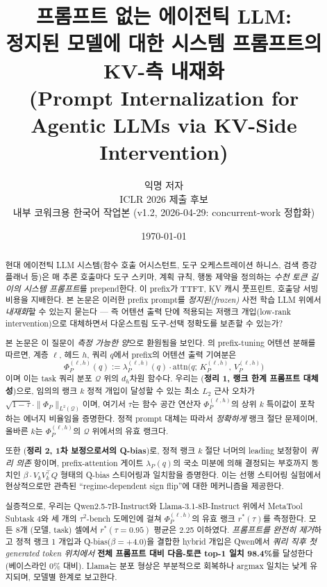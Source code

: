 \documentclass{article}
\title{
  프롬프트 없는 에이전틱 LLM:\\
  정지된 모델에 대한 시스템 프롬프트의 KV-측 내재화\\
  \large (Prompt Internalization for Agentic LLMs via KV-Side Intervention)
}
\author{
  익명 저자\\
  ICLR 2026 제출 후보\\
  내부 코워크용 한국어 작업본 (v1.2, 2026-04-29: concurrent-work 정합화)
}
\date{\today}
\theoremstyle{definition}
\newcommand{\Phip}{\Phi_P}
\newcommand{\dh}{d_h}
\newcommand{\attn}{\mathrm{attn}}
\begin{document}
\maketitle

\begin{abstract}
\noindent
현대 에이전틱 LLM 시스템(함수 호출 어시스턴트, 도구 오케스트레이션 하니스, 검색 증강 플래너 등)은 매 추론 호출마다 도구 스키마, 계획 규칙, 행동 제약을 정의하는 \emph{수천 토큰 길이의 시스템 프롬프트}를 prepend한다. 이 prefix가 TTFT, KV 캐시 풋프린트, 호출당 서빙 비용을 지배한다. 본 논문은 이러한 prefix prompt를 \emph{정지된(frozen)} 사전 학습 LLM 위에서 \emph{내재화}할 수 있는지 묻는다 — 즉 어텐션 출력 단에 적용되는 저랭크 개입(low-rank intervention)으로 대체하면서 다운스트림 도구-선택 정확도를 보존할 수 있는가?

본 논문은 이 질문이 \emph{측정 가능한 양}으로 환원됨을 보인다. \citet{he2022unified}의 prefix-tuning 어텐션 분해를 따르면, 계층 $\ell$, 헤드 $h$, 쿼리 $q$에서 prefix의 어텐션 출력 기여분은
\[
  \Phip^{(\ell,h)}(q) := \lambda_P^{(\ell,h)}(q)\cdot \attn\bigl(q;\, K_P^{(\ell,h)},\, V_P^{(\ell,h)}\bigr)
\]
이며 이는 task 쿼리 분포 $\mathcal{Q}$ 위의 $\dh$차원 함수다. 우리는 (\textbf{정리 1, 랭크 한계 프롬프트 대체성})으로, 임의의 랭크 $k$ 정적 개입이 달성할 수 있는 최소 $L_2$ 근사 오차가 $\sqrt{1-\tau}\cdot\|\Phip\|_{L^2(\mathcal{Q})}$이며, 여기서 $\tau$는 함수 공간 연산자 $\Phip^{(\ell,h)}$의 상위 $k$ 특이값이 포착하는 에너지 비율임을 증명한다. 정적 prompt 대체는 따라서 \emph{정확하게} 랭크 절단 문제이며, 올바른 $k$는 $\Phip^{(\ell,h)}$의 $\mathcal{Q}$ 위에서의 유효 랭크다.

또한 (\textbf{정리 2, 1차 보정으로서의 Q-bias})로, 정적 랭크 $k$ 절단 너머의 leading 보정항이 \emph{쿼리 의존} 항이며, prefix-attention 게이트 $\lambda_P(q)$의 국소 미분에 의해 결정되는 부호까지 동치인 $\beta\cdot V_k V_k^\top Q$ 형태의 Q-bias 스티어링과 일치함을 증명한다. 이는 선행 스티어링 실험에서 현상적으로만 관측된 ``regime-dependent sign flip''에 대한 메커니즘을 제공한다.

실증적으로, 우리는 Qwen2.5-7B-Instruct와 Llama-3.1-8B-Instruct 위에서 MetaTool Subtask 4와 세 개의 $\tau^2$-bench 도메인에 걸쳐 $\Phip^{(\ell,h)}$의 유효 랭크 $r^*(\tau)$를 측정한다. 모든 8개 (모델, task) 셀에서 $r^*(\tau{=}0.95)$ 평균은 2.25 이하였다. \emph{프롬프트를 완전히 제거}하고 정적 랭크 1 개입과 Q-bias($\beta{=}{+}4.0$)을 결합한 hybrid 개입은 Qwen에서 \emph{쿼리 직후 첫 generated token 위치에서} \textbf{전체 프롬프트 대비 다음-토큰 top-1 일치 98.4\%}를 달성한다 (베이스라인 0\% 대비). Llama는 분포 형상은 부분적으로 회복하나 argmax 일치는 낮게 유지되며, 모델별 한계로 보고한다.


\end{abstract}
\end{document}
